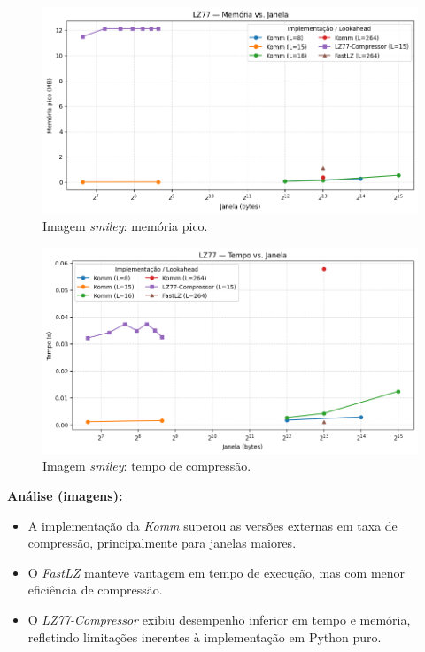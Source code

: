 \begin{figure}[htp]
  \centering
  \caption{Imagem \textit{smiley}: memória pico.}
  \label{fig:external-smiley-memory}
  \includegraphics[width=15cm]{figuras/lz77_smiley_memory_window.png}
\end{figure}

\begin{figure}[htp]
  \centering
  \caption{Imagem \textit{smiley}: tempo de compressão.}
  \label{fig:external-smiley-time}
  \includegraphics[width=15cm]{figuras/lz77_smiley_time_window.png}
\end{figure}

\noindent\textbf{Análise (imagens):}
\begin{itemize}
  \item A implementação da \textit{Komm} superou as versões externas em taxa de compressão, principalmente para janelas maiores.
  \item O \textit{FastLZ} manteve vantagem em tempo de execução, mas com menor eficiência de compressão.
  \item O \textit{LZ77-Compressor} exibiu desempenho inferior em tempo e memória, refletindo limitações inerentes à implementação em Python puro.
\end{itemize}


